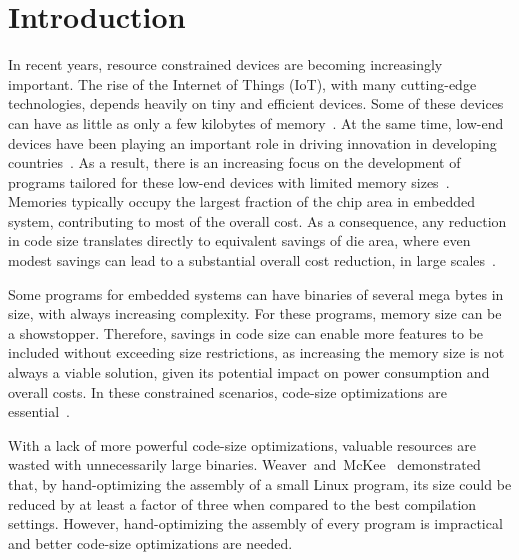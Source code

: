 \section{Introduction}
\label{sec:introduction}


In recent years, resource constrained devices are becoming increasingly important.
The rise of the Internet of Things (IoT), with many cutting-edge technologies,
depends heavily on tiny and efficient devices.
Some of these devices can have as little as only a few kilobytes of
memory~\cite{yelamarthi17,plaza18}.
At the same time, low-end devices have been playing an important role in driving
innovation in developing countries~\cite{hart02,etzo10}.
As a result, there is an increasing focus on the development of programs
tailored for these low-end devices with limited memory sizes~\cite{androidGo,hahm16}.
Memories typically occupy the largest fraction of the chip area in embedded
system, contributing to most of the overall cost.
As a consequence, any reduction in code size translates directly to equivalent
savings of die area, where even modest savings can lead to a substantial overall
cost reduction, in large scales~\cite{edler10}.

Some programs for embedded systems can have binaries of several mega bytes in
size, with always increasing complexity.
For these programs, memory size can be a showstopper.
Therefore, savings in code size can enable more features to be included without
exceeding size restrictions, as increasing the memory size is not always a
viable solution, given its potential impact on power consumption and overall
costs.
In these constrained scenarios, code-size optimizations are essential~\cite{schultz03,varma04,sehgal12,kwan12,keoh14,auler17}.

With a lack of more powerful code-size optimizations, valuable resources are
wasted with unnecessarily large binaries.
Weaver~and~McKee~\cite{weaver09} demonstrated that, by hand-optimizing the
assembly of a small Linux program, its size could be reduced by at least a factor
of three when compared to the best compilation settings.
However, hand-optimizing the assembly of every program is impractical and better
code-size optimizations are needed.

